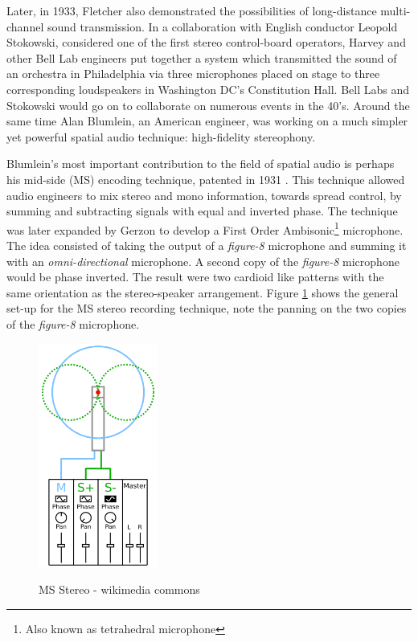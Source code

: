 Later, in 1933, Fletcher also demonstrated the possibilities of long-distance multi-channel sound transmission. In a collaboration with English conductor Leopold Stokowski, considered one of the first stereo control-board operators\cite{mcginn1983stokowski}, Harvey and other Bell Lab engineers put together a system which transmitted the sound of an orchestra in Philadelphia via three microphones placed on stage to three corresponding loudspeakers in Washington DC's Constitution Hall. Bell Labs and Stokowski would go on to collaborate on numerous events in the 40's. Around the same time Alan Blumlein, an American engineer, was working on a much simpler yet powerful spatial audio technique: high-fidelity stereophony. 

Blumlein's most important contribution to the field of spatial audio is perhaps his mid-side (MS) encoding technique, patented in 1931 \cite{billingsley1987simulated}. This technique allowed audio engineers to mix stereo and mono information,  towards spread control, by summing and subtracting signals with equal and inverted phase. The technique was later expanded by Gerzon to develop a First Order Ambisonic\footnote{Also known as tetrahedral microphone} microphone. The idea consisted of taking the output of a \textit{figure-8} microphone and summing it with an \textit{omni-directional} microphone. A second copy of the \textit{figure-8} microphone would be phase inverted. The result were two cardioid like patterns with the same orientation as the stereo-speaker arrangement. Figure \ref{fig:ms_stereo} shows the general set-up for the MS stereo recording technique, note the panning on the two copies of the \textit{figure-8} microphone. 

\begin{figure}[h!]%
\centering
\includegraphics[width=0.35\textwidth]{img/ms_stereo.svg.png} 
\label{fig:ms_stereo}
\caption{MS Stereo - wikimedia commons}
\end{figure}

